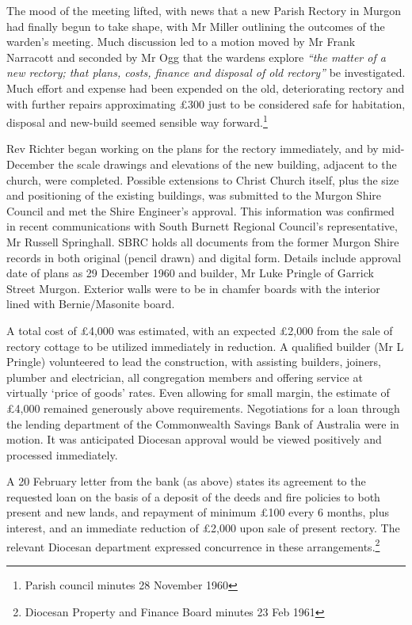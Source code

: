 The mood of the meeting lifted, with news that a new Parish Rectory in Murgon had finally begun to take shape, with Mr Miller outlining the outcomes of the warden's meeting. Much discussion led to a motion moved by Mr Frank Narracott and seconded by Mr Ogg that the wardens explore \emph{``the matter of a new rectory; that plans, costs, finance and disposal of old rectory''} be investigated. Much effort and expense had been expended on the old, deteriorating rectory and with further repairs approximating £300 just to be considered safe for habitation, disposal and new-build seemed sensible way forward.\footnote{Parish council minutes 28 November 1960}

Rev Richter began working on the plans for the rectory immediately, and by mid-December the scale drawings and elevations of the new building, adjacent to the church, were completed. Possible extensions to Christ Church itself, plus the size and positioning of the existing buildings, was submitted to the Murgon Shire Council and met the Shire Engineer's approval. This information was confirmed in recent communications with South Burnett Regional Council's representative, Mr Russell Springhall. SBRC holds all documents from the former Murgon Shire records in both original (pencil drawn) and digital form. Details include approval date of plans as 29 December 1960 and builder, Mr Luke Pringle of Garrick Street Murgon. Exterior walls were to be in chamfer boards with the interior lined with Bernie/Masonite board.

A total cost of £4,000 was estimated, with an expected £2,000 from the sale of rectory cottage to be utilized immediately in reduction. A qualified builder (Mr L Pringle) volunteered to lead the construction, with assisting builders, joiners, plumber and electrician, all congregation members and offering service at virtually `price of goods' rates. Even allowing for small margin, the estimate of £4,000 remained generously above requirements. Negotiations for a loan through the lending department of the Commonwealth Savings Bank of Australia were in motion. It was anticipated Diocesan approval would be viewed positively and processed immediately.

A 20 February letter from the bank (as above) states its agreement to the requested loan on the basis of a deposit of the deeds and fire policies to both present and new lands, and repayment of minimum £100 every 6 months, plus interest, and an immediate reduction of £2,000 upon sale of present rectory. The relevant Diocesan department expressed concurrence in these arrangements.\footnote{Diocesan Property and Finance Board minutes 23 Feb 1961}

